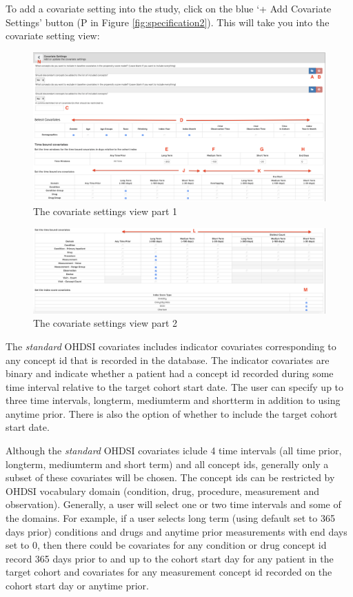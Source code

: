 \documentclass[11pt]{book}
\theoremstyle{definition}
\theoremstyle{definition}
\theoremstyle{definition}
\theoremstyle{remark}
\begin{document}
To add a covariate setting into the study, click on the blue `+ Add Covariate Settings' button (P in Figure \ref{fig:specification2}). This will take you into the covariate setting view:

\begin{figure}
\includegraphics[width=1\linewidth]{images/PatientLevelPrediction/atlasImplementation/covariates_p1} \caption{The covariate settings view part 1}\label{fig:covariate1}
\end{figure}

\begin{figure}
\includegraphics[width=1\linewidth]{images/PatientLevelPrediction/atlasImplementation/covariates_p2} \caption{The covariate settings view part 2}\label{fig:covariate2}
\end{figure}

The \emph{standard} OHDSI covariates includes indicator covariates corresponding to any concept id that is recorded in the database. The indicator covariates are binary and indicate whether a patient had a concept id recorded during some time interval relative to the target cohort start date. The user can specify up to three time intervals, longterm, mediumterm and shortterm in addition to using anytime prior. There is also the option of whether to include the target cohort start date.

Although the \emph{standard} OHDSI covariates iclude 4 time intervals (all time prior, longterm, mediumterm and short term) and all concept ids, generally only a subset of these covariates will be chosen. The concept ids can be restricted by OHDSI vocabulary domain (condition, drug, procedure, measurement and observation). Generally, a user will select one or two time intervals and some of the domains. For example, if a user selects long term (using default set to 365 days prior) conditions and drugs and anytime prior measurements with end days set to 0, then there could be covariates for any condition or drug concept id record 365 days prior to and up to the cohort start day for any patient in the target cohort and covariates for any measurement concept id recorded on the cohort start day or anytime prior.
\end{document}
